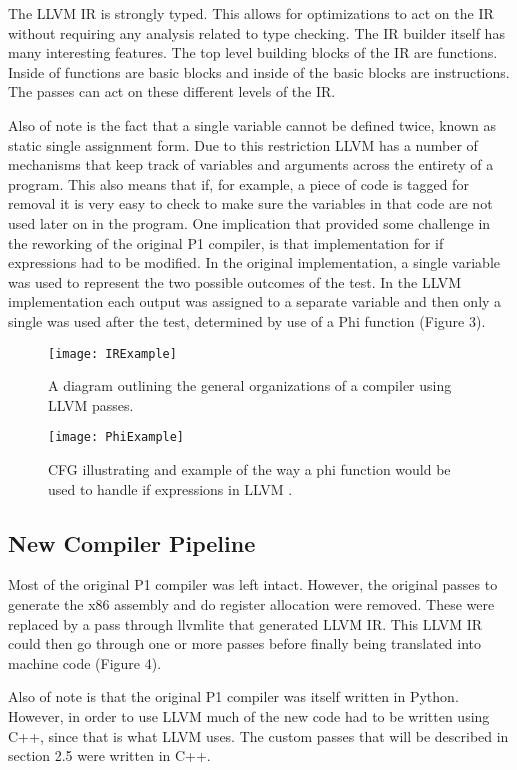 The LLVM IR is strongly typed. This allows for optimizations to act on the IR without requiring any analysis related to type checking. The IR builder itself has many interesting features. The top level building blocks of the IR are functions. Inside of functions are basic blocks and inside of the basic blocks are instructions. The passes can act on these different levels of the IR.

Also of note is the fact that a single variable cannot be defined twice, known as static single assignment form. Due to this restriction LLVM has a number of mechanisms that keep track of variables and arguments across the entirety of a program. This also means that if, for example, a piece of code is tagged for removal it is very easy to check to make sure the variables in that code are not used later on in the program. One implication that provided some challenge in the reworking of the original P1 compiler, is that implementation for if expressions had to be modified. In the original implementation, a single variable was used to represent the two possible outcomes of the test. In the LLVM implementation each output was assigned to a separate variable and then only a single was used after the test, determined by use of a Phi function\cite{LLVMIR} (Figure 3).

\begin{figure}
\texttt{[image: IRExample]}
\caption{A diagram outlining the general organizations of a compiler using LLVM passes.}
\end{figure}

\begin{figure}
\texttt{[image: PhiExample]}
\caption{CFG illustrating and example of the way a phi function would be used to handle if expressions in LLVM \cite{Gitsklam}.}
\end{figure}

\subsection{New Compiler Pipeline}

Most of the original P1 compiler was left intact. However, the original passes to generate the x86 assembly and do register allocation were removed. These were replaced by a pass through llvmlite that generated LLVM IR. This LLVM IR could then go through one or more passes before finally being translated into machine code (Figure 4).

Also of note is that the original P1 compiler was itself written in Python. However, in order to use LLVM much of the new code had to be written using C++, since that is what LLVM uses. The custom passes that will be described in section 2.5 were written in C++.


